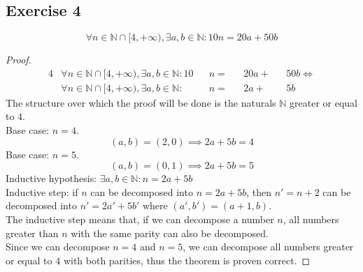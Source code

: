 \documentclass[docid=TP01]{tcom_TP}
\begin{document}
\subsection{Exercise 4}
\begin{theorem}
	\begin{equation*}
		\forall n \in \mathbb{N}\cap[4,+\infty),\exists a,b\in\mathbb{N}\colon 10n=20a+50b
	\end{equation*}
\end{theorem}
\begin{proof}
	\begin{alignat*}{4}
		&\forall n \in \mathbb{N}\cap[4,+\infty),\exists a,b\in\mathbb{N}\colon 10&&n=&&20a+&&50b \iff \\
		&\forall n \in \mathbb{N}\cap[4,+\infty),\exists a,b\in\mathbb{N}\colon   &&n=&&2a +&&5b
	\end{alignat*}
	The structure over which the proof will be done is the naturals $\mathbb{N}$ greater or equal to $4$.\\
	Base case: $n=4$.
	\begin{equation*}
		(a,b)=(2,0) \implies 2a+5b=4
	\end{equation*}
	Base case: $n=5$.
	\begin{equation*}
		(a,b)=(0,1) \implies 2a+5b=5
	\end{equation*}
	Inductive hypothesis: $\exists a,b\in\mathbb{N}\colon n=2a+5b$\\
	Inductive step: if $n$ can be decomposed into $n=2a+5b$, then $n'=n+2$ can be decomposed into $n'=2a'+5b'$ where $(a',b')=(a+1,b)$.\\
	The inductive step means that, if we can decompose a number $n$, all numbers greater than $n$ with the same parity can also be decomposed.\\
	Since we can decompose $n=4$ and $n=5$, we can decompose all numbers greater or equal to $4$ with both parities, thus the theorem is proven correct.
\end{proof}
\end{document}
